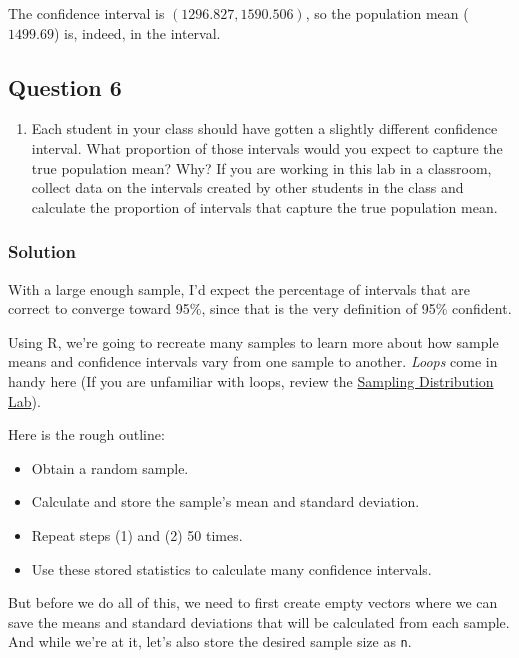 \documentclass[]{article}
\providecommand{\tightlist}{%
  \setlength{\itemsep}{0pt}\setlength{\parskip}{0pt}}
\begin{document}
The confidence interval is \((1296.827, 1590.506)\), so the population
mean (\(1499.69\)) is, indeed, in the interval.

\subsection{Question 6}\label{question-6}

\begin{enumerate}
\def\labelenumi{\arabic{enumi}.}
\setcounter{enumi}{5}
\tightlist
\item
  Each student in your class should have gotten a slightly different
  confidence interval. What proportion of those intervals would you
  expect to capture the true population mean? Why? If you are working in
  this lab in a classroom, collect data on the intervals created by
  other students in the class and calculate the proportion of intervals
  that capture the true population mean.
\end{enumerate}

\subsubsection{Solution}\label{solution-5}

With a large enough sample, I'd expect the percentage of intervals that
are correct to converge toward 95\%, since that is the very definition
of 95\% confident.

Using R, we're going to recreate many samples to learn more about how
sample means and confidence intervals vary from one sample to another.
\emph{Loops} come in handy here (If you are unfamiliar with loops,
review the
\href{http://htmlpreview.github.io/?https://github.com/andrewpbray/oiLabs/blob/master/sampling_distributions/sampling_distributions.html}{Sampling
Distribution Lab}).

Here is the rough outline:

\begin{itemize}
\tightlist
\item
  Obtain a random sample.
\item
  Calculate and store the sample's mean and standard deviation.
\item
  Repeat steps (1) and (2) 50 times.
\item
  Use these stored statistics to calculate many confidence intervals.
\end{itemize}

But before we do all of this, we need to first create empty vectors
where we can save the means and standard deviations that will be
calculated from each sample. And while we're at it, let's also store the
desired sample size as \texttt{n}.
\end{document}
